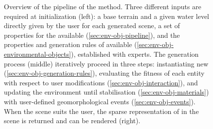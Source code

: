 \begin{figure}[H]
    \caption{Overview of the pipeline of the method. Three different inputs are required at initialization (left): a base terrain and a given water level directly given by the user for each generated scene, a set of properties for the  available (\cref{sec:env-obj-pipeline}), and the properties and generation rules of  available (\cref{sec:env-obj-environmental-objects}), established with experts. The generation process (middle) iteratively proceed in three steps: instantiating new  (\cref{sec:env-obj-generation-rules}), evaluating the fitness of each entity with respect to user modifications (\cref{sec:env-obj-interaction}), and updating the environment until stabilisation (\cref{sec:env-obj-materials}) with user-defined geomorphological events (\cref{sec:env-obj-events}). When the scene suits the user, the sparse representation of  in the scene is returned and can be rendered (right). }
    \label{fig:env-obj-pipeline}
\end{figure}



